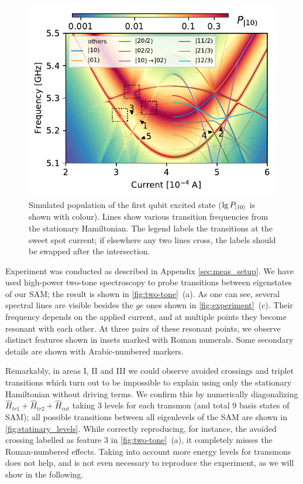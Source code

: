\documentclass[%
 aip,
 amsmath,amssymb,
 reprint,%
]{revtex4-1}
\begin{document}
\begin{figure}
	\centering
	\includegraphics[width=\linewidth]{stationary}
	\caption{Simulated population of the first qubit excited state ($\lg P_{\ket{10}}$ is shown with colour). Lines show various transition frequencies from the stationary Hamiltonian. The legend labels the transitions at the sweet spot current; if elsewhere any two lines cross, the labels should be swapped after the intersection.}
	\label{fig:statinary_levels}
\end{figure}


Experiment was conducted as described in Appendix \ref{sec:meas_setup}. We have used high-power two-tone spectroscopy to probe transitions between eigenstates of our SAM; the result is shown in \autoref{fig:two-tone}~(a). As one can see, several spectral lines are visible besides the $ge$ ones shown in \autoref{fig:experiment}~(c). Their frequency depends on the applied current, and at multiple points they become resonant with each other. At three pairs of these resonant points, we observe distinct features shown in insets marked with Roman numerals. Some secondary details are shown with Arabic-numbered markers.

Remarkably, in areas I, II and III we could observe avoided crossings and triplet transitions which turn out to be impossible to explain using only the stationary Hamiltonian without driving terms. We confirm this by numerically diagonalizing $\hat H_{tr1}+\hat H_{tr2}+\hat H_{int}$ taking 3 levels for each transmon (and total 9 basis states of SAM); all possible transitions between all eigenlevels of the SAM are shown in \autoref{fig:statinary_levels}. While correctly reproducing, for instance, the avoided crossing labelled as feature 3 in \autoref{fig:two-tone}~(a), it completely misses the Roman-numbered effects. Taking into account more energy levels for transmons does not help, and is not even necessary to reproduce the experiment, as we will show in the following.
\end{document}
